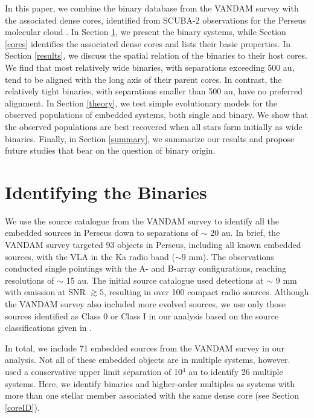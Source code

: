 \documentclass[usenatbib,a4paper]{mnras}
\begin{document}
In this paper, we combine the binary database from the VANDAM survey \citep{Tobin16} with the associated dense cores, identified from SCUBA-2 observations for the Perseus molecular cloud \citep[$d=235$ pc;][]{Hirota08}.  In Section \ref{binaries}, we present the binary systems, while Section \ref{cores} identifies the associated dense cores and lists their basic properties.  In Section \ref{results}, we discuss the spatial relation of the binaries to their host cores.  We find that most relatively wide binaries, with separations exceeding 500 au, tend to be aligned with the long axis of their parent cores.  In contrast, the relatively tight binaries, with separations smaller than 500 au, have no preferred alignment.  In Section \ref{theory}, we test simple evolutionary models for the observed populations of embedded systems, both single and binary.  We show that the observed populations are best recovered when all stars form initially as wide binaries.  Finally, in Section \ref{summary}, we summarize our results and propose future studies that bear on the question of binary origin.
 
 


\section{Identifying the Binaries}\label{binaries}

We use the source catalogue from the VANDAM survey \citep{Tobin16} to identify all the embedded sources in Perseus down to separations of $\sim$ 20 au.  In brief, the VANDAM survey targeted 93 objects in Perseus, including all known embedded sources, with the VLA in the Ka radio band ($\sim 9$ mm).  The observations conducted single pointings with the A- and B-array configurations, reaching resolutions of $\sim$ 15 au.  The initial source catalogue used detections at $\sim$ 9 mm with emission at SNR $\gtrsim 5$, resulting in over 100 compact radio sources.  Although the VANDAM survey also included more evolved sources, we use only those sources identified as Class 0 or Class I in our analysis based on the source classifications given in \citet{Tobin16}. 

In total, we include 71 embedded sources from the VANDAM survey in our analysis.   Not all of these embedded objects are in multiple systems, however.  \citet{Tobin16} used a conservative upper limit separation of 10$^4$ au to identify 26 multiple systems.  Here, we identify binaries and higher-order multiples as systems with more than one stellar member associated with the same dense core (see Section \ref{coreID}).   
\end{document}

